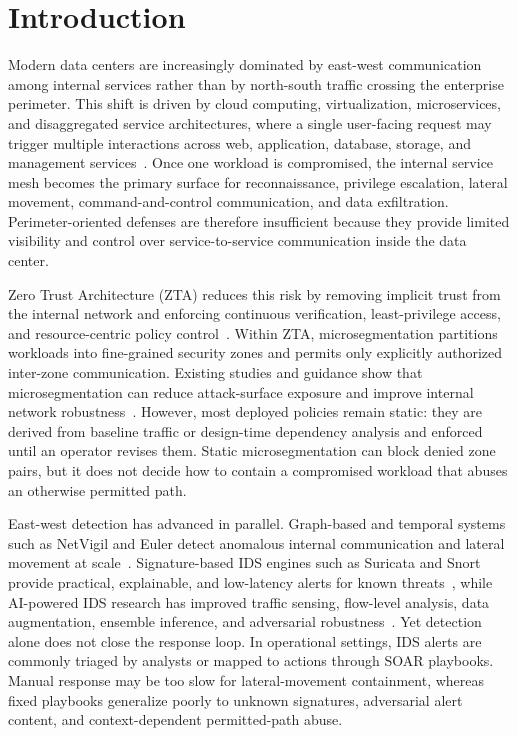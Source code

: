 \documentclass[final,5p]{elsarticle}
\begin{document}
\section{Introduction}
\label{sec:introduction}

Modern data centers are increasingly dominated by east-west communication among internal services rather than by north-south traffic crossing the enterprise perimeter. This shift is driven by cloud computing, virtualization, microservices, and disaggregated service architectures, where a single user-facing request may trigger multiple interactions across web, application, database, storage, and management services~\cite{nielsen2017flipping}. Once one workload is compromised, the internal service mesh becomes the primary surface for reconnaissance, privilege escalation, lateral movement, command-and-control communication, and data exfiltration. Perimeter-oriented defenses are therefore insufficient because they provide limited visibility and control over service-to-service communication inside the data center.

Zero Trust Architecture (ZTA) reduces this risk by removing implicit trust from the internal network and enforcing continuous verification, least-privilege access, and resource-centric policy control~\cite{ward2014beyondcorp,rose2020zerotrust}. Within ZTA, microsegmentation partitions workloads into fine-grained security zones and permits only explicitly authorized inter-zone communication. Existing studies and guidance show that microsegmentation can reduce attack-surface exposure and improve internal network robustness~\cite{basta2022towards,buck2021nevertrust,syed2022ztasurvey,chandramouli2023zta207a,chandramouli2020sp800204a}. However, most deployed policies remain static: they are derived from baseline traffic or design-time dependency analysis and enforced until an operator revises them. Static microsegmentation can block denied zone pairs, but it does not decide how to contain a compromised workload that abuses an otherwise permitted path.

East-west detection has advanced in parallel. Graph-based and temporal systems such as NetVigil and Euler detect anomalous internal communication and lateral movement at scale~\cite{netvigil,king2022euler}. Signature-based IDS engines such as Suricata and Snort provide practical, explainable, and low-latency alerts for known threats~\cite{oisf2026suricata}, while AI-powered IDS research has improved traffic sensing, flow-level analysis, data augmentation, ensemble inference, and adversarial robustness~\cite{jAPELID24,jAA-IDS25}. Yet detection alone does not close the response loop. In operational settings, IDS alerts are commonly triaged by analysts or mapped to actions through SOAR playbooks. Manual response may be too slow for lateral-movement containment, whereas fixed playbooks generalize poorly to unknown signatures, adversarial alert content, and context-dependent permitted-path abuse.
\end{document}
